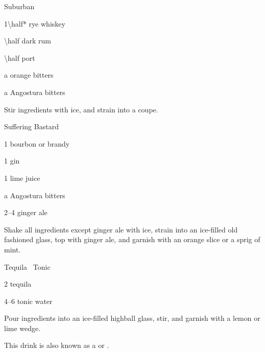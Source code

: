 \begin{Cocktail}{Suburban}
  \begin{Ingredients}
  \item \SI{1\half*}{\oz} rye whiskey
  \item \SI{\half}{\oz} dark rum
  \item \SI{\half}{\oz} port
  \item a \si{\dash} orange bitters
  \item a \si{\dash} Angostura bitters
  \end{Ingredients}
  
  \begin{Instructions}
	Stir ingredients with ice, and strain into a coupe.
  \end{Instructions}
\end{Cocktail}

\begin{Cocktail}{Suffering Bastard}
  \begin{Ingredients}
  \item \SI{1}{\oz} bourbon or brandy
  \item \SI{1}{\oz} gin
  \item \SI{1}{\oz} lime juice
  \item a \si{\dash} Angostura bitters
  \item \SIrange{2}{4}{\oz} ginger ale
  \end{Ingredients}
  
  \begin{Instructions}
	Shake all ingredients except ginger ale with ice, strain into an ice-filled old fashioned glass, top with ginger ale, and garnish with an orange slice or a sprig of mint.
  \end{Instructions}
\end{Cocktail}

\begin{Cocktail}{Tequila \And\ Tonic}
  \begin{Ingredients}
  \item \SI{2}{\oz} tequila
  \item \SIrange{4}{6}{\oz} tonic water
  \end{Ingredients}
  
  \begin{Instructions}
	Pour ingredients into an ice-filled highball glass, stir, and garnish with a lemon or lime wedge.
	
	This drink is also known as a  or .
  \end{Instructions}
\end{Cocktail}

